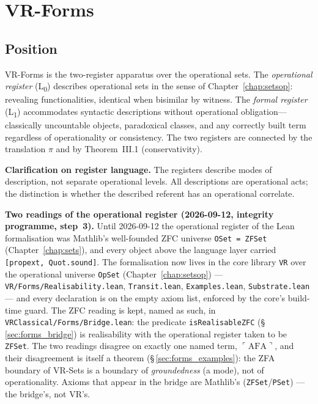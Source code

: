 \chapter{VR-Forms}
\label{chap:forms}

\section{Position}
\label{sec:forms_position}

VR-Forms is the two-register apparatus over the operational sets.  The
\emph{operational register} (L\textsubscript{0}) describes operational sets
in the sense of Chapter~\ref{chap:setsop}: revealing functionalities,
identical when bisimilar by witness.  The \emph{formal register}
(L\textsubscript{1}) accommodates syntactic descriptions without operational
obligation---classically uncountable objects, paradoxical classes, and any
correctly built term regardless of operationality or consistency.  The two
registers are connected by the translation $\pi$ and by Theorem~III.1
(conservativity).

\textbf{Clarification on register language.} The registers describe modes
of description, not separate operational levels.  All descriptions are
operational acts; the distinction is whether the described referent has an
operational correlate.

\textbf{Two readings of the operational register (2026-09-12, integrity
programme, step~3).}  Until 2026-09-12 the operational register of the Lean
formalisation was Mathlib's well-founded ZFC universe \texttt{OSet = ZFSet}
(Chapter~\ref{chap:sets}), and every object above the language layer
carried \texttt{[propext, Quot.sound]}.  The formalisation now lives in the
core library \texttt{VR} over the operational universe \texttt{OpSet}
(Chapter~\ref{chap:setsop}) --- \texttt{VR/Forms/Realisability.lean},
\texttt{Transit.lean}, \texttt{Examples.lean}, \texttt{Substrate.lean} ---
and every declaration is on the empty axiom list, enforced by the core's
build-time guard.  The ZFC reading is kept, named as such, in
\texttt{VRClassical/Forms/Bridge.lean}: the predicate
\texttt{isRealisableZFC} (\S\,\ref{sec:forms_bridge}) is realisability with
the operational register taken to be \texttt{ZFSet}.  The two readings
disagree on exactly one named term, $\ulcorner\mathrm{AFA}\urcorner$, and
their disagreement is itself a theorem (\S\,\ref{sec:forms_examples}): the
ZFA boundary of VR-Sets is a boundary of \emph{groundedness} (a mode), not
of operationality.  Axioms that appear in the bridge are Mathlib's
(\texttt{ZFSet}/\texttt{PSet}) --- the bridge's, not VR's.

